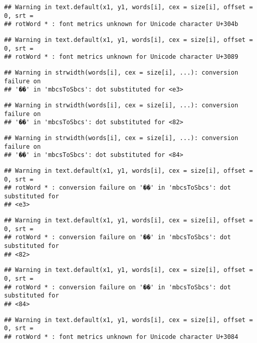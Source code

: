 \documentclass[]{article}
\begin{document}
\begin{verbatim}
## Warning in text.default(x1, y1, words[i], cex = size[i], offset = 0, srt =
## rotWord * : font metrics unknown for Unicode character U+304b
\end{verbatim}

\begin{verbatim}
## Warning in text.default(x1, y1, words[i], cex = size[i], offset = 0, srt =
## rotWord * : font metrics unknown for Unicode character U+3089
\end{verbatim}

\begin{verbatim}
## Warning in strwidth(words[i], cex = size[i], ...): conversion failure on
## '��' in 'mbcsToSbcs': dot substituted for <e3>
\end{verbatim}

\begin{verbatim}
## Warning in strwidth(words[i], cex = size[i], ...): conversion failure on
## '��' in 'mbcsToSbcs': dot substituted for <82>
\end{verbatim}

\begin{verbatim}
## Warning in strwidth(words[i], cex = size[i], ...): conversion failure on
## '��' in 'mbcsToSbcs': dot substituted for <84>
\end{verbatim}

\begin{verbatim}
## Warning in text.default(x1, y1, words[i], cex = size[i], offset = 0, srt =
## rotWord * : conversion failure on '��' in 'mbcsToSbcs': dot substituted for
## <e3>
\end{verbatim}

\begin{verbatim}
## Warning in text.default(x1, y1, words[i], cex = size[i], offset = 0, srt =
## rotWord * : conversion failure on '��' in 'mbcsToSbcs': dot substituted for
## <82>
\end{verbatim}

\begin{verbatim}
## Warning in text.default(x1, y1, words[i], cex = size[i], offset = 0, srt =
## rotWord * : conversion failure on '��' in 'mbcsToSbcs': dot substituted for
## <84>
\end{verbatim}

\begin{verbatim}
## Warning in text.default(x1, y1, words[i], cex = size[i], offset = 0, srt =
## rotWord * : font metrics unknown for Unicode character U+3084
\end{verbatim}
\end{document}
